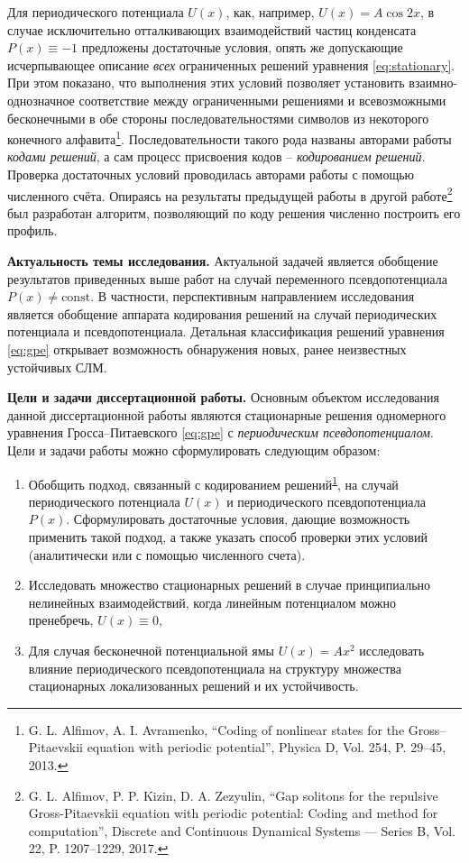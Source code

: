 \documentclass[candidate, href, colorlinks]{disser}
\begin{document}
Для периодического потенциала $U(x)$, как, например, $U(x) = A \cos 2x$, в случае исключительно отталкивающих взаимодействий частиц конденсата $P(x) \equiv -1$ предложены достаточные условия, опять же допускающие исчерпывающее описание {\it всех} ограниченных решений уравнения \eqref{eq:stationary}.
При этом показано, что выполнения этих условий позволяет установить взаимно-однозначное соответствие между ограниченными решениями и всевозможными бесконечными в обе стороны последовательностями символов из некоторого конечного алфавита\footnote{\label{note:alfavr} G. L. Alfimov, A. I. Avramenko, ``Coding of nonlinear states for the Gross--Pitaevskii equation with periodic potential'', Physica D, Vol. 254, P. 29--45, 2013.}.
Последовательности такого рода названы авторами работы {\it кодами решений}, а сам процесс присвоения кодов -- {\it кодированием решений}.
Проверка достаточных условий проводилась авторами работы с помощью численного счёта.
Опираясь на результаты предыдущей работы в другой работе\footnote{G. L. Alfimov, P. P. Kizin, D. A. Zezyulin, ``Gap solitons for the repulsive Gross-Pitaevskii equation with periodic potential: Coding and method for computation'', Discrete and Continuous Dynamical Systems --- Series B, Vol. 22, P. 1207--1229, 2017.} был разработан алгоритм, позволяющий по коду решения численно построить его профиль.

\textbf{Актуальность темы исследования.}
Актуальной задачей является обобщение результатов приведенных выше работ на случай переменного псевдопотенциала $P(x) \neq \mathrm{const}$.
В частности, перспективным направлением исследования является обобщение аппарата кодирования решений на случай периодических потенциала и псевдопотенциала.
Детальная классификация решений уравнения \eqref{eq:gpe} открывает возможность обнаружения новых, ранее неизвестных устойчивых СЛМ.

\textbf{Цели и задачи диссертационной работы.}
Основным объектом исследования данной диссертационной работы являются стационарные решения одномерного уравнения Гросса--Питаевского \eqref{eq:gpe} с {\it периодическим псевдопотенциалом}.
Цели и задачи работы можно сформулировать следующим образом:
\begin{enumerate}
	\item Обобщить подход, связанный с кодированием решений\textsuperscript{\ref{note:alfavr}}, на случай периодического потенциала $U(x)$ и периодического псевдопотенциала $P(x)$.
		Сформулировать достаточные условия, дающие возможность применить такой подход, а также указать способ проверки этих условий (аналитически или с помощью численного счета).
	\item Исследовать множество стационарных решений в случае принципиально нелинейных взаимодействий, когда линейным потенциалом можно пренебречь, $U(x) \equiv 0$, 
	\item Для случая бесконечной потенциальной ямы $U(x) = A x^2$ исследовать влияние периодического псевдопотенциала на структуру множества стационарных локализованных решений и их устойчивость.
\end{enumerate}
\end{document}
